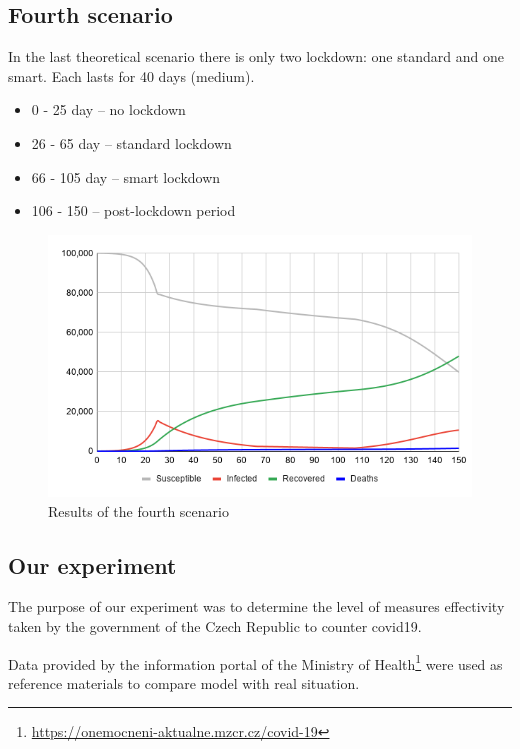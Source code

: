 \documentclass[12pt,a4paper,english]{article}
\begin{document}
    \subsection{Fourth scenario}
    \label{fourth_scenario}
    In the last theoretical scenario there is only two lockdown: one standard and one smart.
    Each lasts for 40 days (medium).
    \begin{itemize}
        \item 0 - 25 day -- no lockdown
        \item 26 - 65 day -- standard lockdown 
        \item 66 - 105 day -- smart lockdown
        \item 106 - 150 -- post-lockdown period
    \end{itemize}
    \begin{figure}[h!]
        \centering
        \includegraphics[scale=0.55]{med+smart.png}
        \caption{Results of the fourth scenario}
    \end{figure}
    
    \newpage
    \subsection{Our experiment}

    The purpose of our experiment was to determine the level of measures effectivity  taken by the government of the Czech Republic to counter covid19.
    
    Data provided by the information portal of the Ministry of Health\footnote{\url{https://onemocneni-aktualne.mzcr.cz/covid-19}} 
    were used as reference materials to compare model with real situation.
    
\end{document}
